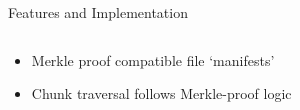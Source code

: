 \begin{frame}{Features and Implementation}
\begin{overlayarea}{\textwidth}{10cm}
\begin{columns}[t]
\begin{block}
{\begin{itemize}
       \item Merkle proof compatible file `manifests'
       \item Chunk traversal follows Merkle-proof logic
      \end{itemize}
      }
    \end{block}
%
\end{columns}
\end{overlayarea}
\end{frame}


%
%
%
%
%
%
%

